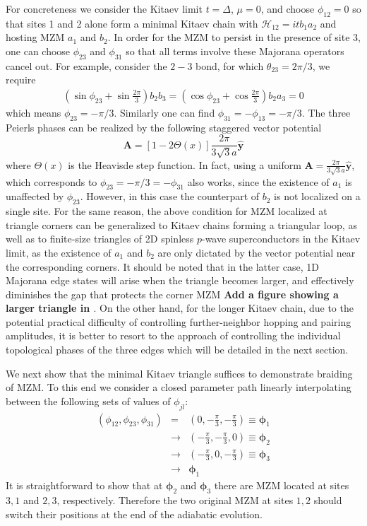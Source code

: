 \documentclass[aps,prb,showpacs,amsmath,twocolumn,amssymb,superscriptaddress]{revtex4-2}
\let\oldhat\hat
\renewcommand{\hat}[1]{\oldhat{\mathbf{#1}}}
\renewcommand{\vec}[1]{\mathbf{#1}}
\newcommand{\de}{\Delta}
\begin{document}
For concreteness we consider the Kitaev limit $t=\de$, $\mu=0$, and choose $\phi_{12} = 0$ so that sites 1 and 2 alone form a minimal Kitaev chain with $\mathcal{H}_{12} = itb_1a_2$ and hosting MZM $a_1$ and $b_2$. In order for the MZM to persist in the presence of site 3, one can choose $\phi_{23}$ and $\phi_{31}$ so that all terms involve these Majorana operators cancel out. For example, consider the $2-3$ bond, for which $\theta_{23} = 2\pi/3$, we require
\begin{align}
  \left(\sin\phi_{23} + \sin\frac{2\pi}{3}\right) b_2 b_3 =\left(\cos\phi_{23} + \cos\frac{2\pi}{3}\right)b_2 a_3 = 0
\end{align}
which means $\phi_{23} = -\pi/3$. Similarly one can find $\phi_{31} =-\phi_{13} = -\pi/3$. The three Peierls phases can be realized by the following staggered vector potential
\begin{equation}\label{eq:Astep}
  \vec{A} =\left[1-2\Theta(x)\right]\frac{2 \pi}{3\sqrt{3}a} \hat{y} 
\end{equation}
where $\Theta(x)$ is the Heavisde step function. In fact, using a uniform $\vec{A} =\frac{2 \pi}{3\sqrt{3}a} \hat{y}$, which corresponds to $\phi_{23} = -\pi/3 = -\phi_{31}$ also works, since the existence of $a_1$ is unaffected by $\phi_{23}$. However, in this case the counterpart of $b_2$ is not localized on a single site. For the same reason, the above condition for MZM localized at triangle corners can be generalized to Kitaev chains forming a triangular loop, as well as to finite-size triangles of 2D spinless $p$-wave superconductors in the Kitaev limit, as the existence of $a_1$ and $b_2$ are only dictated by the vector potential near the corresponding corners. It should be noted that in the latter case, 1D Majorana edge states will arise when the triangle becomes larger, and effectively diminishes the gap that protects the corner MZM {\bf Add a figure showing a larger triangle in \cite{supp}}. On the other hand, for the longer Kitaev chain, due to the potential practical difficulty of controlling further-neighbor hopping and pairing amplitudes, it is better to resort to the approach of controlling the individual topological phases of the three edges which will be detailed in the next section. 

We next show that the minimal Kitaev triangle suffices to demonstrate braiding of MZM. To this end we consider a closed parameter path linearly interpolating between the following sets of values of $\phi_{jl}$:
\begin{eqnarray}
    (\phi_{12},\phi_{23},\phi_{31}) &=& \left(0,-\frac{\pi}{3},-\frac{\pi}{3}\right ) \equiv \bm \phi_1 \\\nonumber
    &\rightarrow& \left(-\frac{\pi}{3},-\frac{\pi}{3},0 \right) \equiv \bm \phi_2 \\\nonumber
    &\rightarrow& \left(-\frac{\pi}{3},0,-\frac{\pi}{3} \right) \equiv \bm \phi_3 \\\nonumber
    &\rightarrow& \bm \phi_1
\end{eqnarray}
It is straightforward to show that at $\bm \phi_{2}$ and $\bm \phi_3$ there are MZM located at sites $3,1$ and $2,3$, respectively. Therefore the two original MZM at sites $1,2$ should switch their positions at the end of the adiabatic evolution. 
\end{document}
